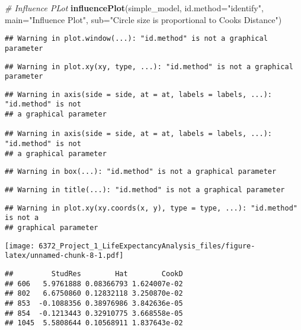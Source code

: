 \documentclass[
]{article}
\newenvironment{Shaded}{\begin{snugshade}}{\end{snugshade}}
\newcommand{\AttributeTok}[1]{\textcolor[rgb]{0.13,0.29,0.53}{#1}}
\newcommand{\CommentTok}[1]{\textcolor[rgb]{0.56,0.35,0.01}{\textit{#1}}}
\newcommand{\FunctionTok}[1]{\textcolor[rgb]{0.13,0.29,0.53}{\textbf{#1}}}
\newcommand{\NormalTok}[1]{#1}
\newcommand{\StringTok}[1]{\textcolor[rgb]{0.31,0.60,0.02}{#1}}
\begin{document}
\begin{Shaded}
\begin{Highlighting}[]
\CommentTok{\# Influence PLot}
\FunctionTok{influencePlot}\NormalTok{(simple\_model, }\AttributeTok{id.method=}\StringTok{"identify"}\NormalTok{, }\AttributeTok{main=}\StringTok{"Influence Plot"}\NormalTok{, }
              \AttributeTok{sub=}\StringTok{"Circle size is proportional to Cook\textquotesingle{}s Distance"}\NormalTok{)}
\end{Highlighting}
\end{Shaded}

\begin{verbatim}
## Warning in plot.window(...): "id.method" is not a graphical parameter
\end{verbatim}

\begin{verbatim}
## Warning in plot.xy(xy, type, ...): "id.method" is not a graphical parameter
\end{verbatim}

\begin{verbatim}
## Warning in axis(side = side, at = at, labels = labels, ...): "id.method" is not
## a graphical parameter

## Warning in axis(side = side, at = at, labels = labels, ...): "id.method" is not
## a graphical parameter
\end{verbatim}

\begin{verbatim}
## Warning in box(...): "id.method" is not a graphical parameter
\end{verbatim}

\begin{verbatim}
## Warning in title(...): "id.method" is not a graphical parameter
\end{verbatim}

\begin{verbatim}
## Warning in plot.xy(xy.coords(x, y), type = type, ...): "id.method" is not a
## graphical parameter
\end{verbatim}

\texttt{[image: 6372\_Project\_1\_LifeExpectancyAnalysis\_files/figure-latex/unnamed-chunk-8-1.pdf]}

\begin{verbatim}
##         StudRes        Hat        CookD
## 606   5.9761888 0.08366793 1.624007e-02
## 802   6.6750860 0.12832118 3.250870e-02
## 853  -0.1088356 0.38976986 3.842636e-05
## 854  -0.1213443 0.32910775 3.668558e-05
## 1045  5.5808644 0.10568911 1.837643e-02
\end{verbatim}
\end{document}
